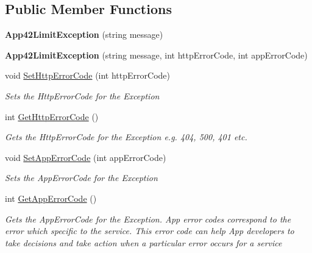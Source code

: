 \subsection*{Public Member Functions}
\begin{DoxyCompactItemize}
\item 
\hypertarget{classcom_1_1shephertz_1_1app42_1_1paas_1_1sdk_1_1csharp_1_1_app42_limit_exception_ac98c7c58d010aa0bf91cc23e1a3260be}{{\bfseries App42\+Limit\+Exception} (string message)}\label{classcom_1_1shephertz_1_1app42_1_1paas_1_1sdk_1_1csharp_1_1_app42_limit_exception_ac98c7c58d010aa0bf91cc23e1a3260be}

\item 
\hypertarget{classcom_1_1shephertz_1_1app42_1_1paas_1_1sdk_1_1csharp_1_1_app42_limit_exception_ab17a56216361854b0c3a8045c3a26895}{{\bfseries App42\+Limit\+Exception} (string message, int http\+Error\+Code, int app\+Error\+Code)}\label{classcom_1_1shephertz_1_1app42_1_1paas_1_1sdk_1_1csharp_1_1_app42_limit_exception_ab17a56216361854b0c3a8045c3a26895}

\item 
void \hyperlink{classcom_1_1shephertz_1_1app42_1_1paas_1_1sdk_1_1csharp_1_1_app42_limit_exception_a641656b981cee64d150760ec808f8dad}{Set\+Http\+Error\+Code} (int http\+Error\+Code)
\begin{DoxyCompactList}\small\item\em Sets the Http\+Error\+Code for the Exception \end{DoxyCompactList}\item 
int \hyperlink{classcom_1_1shephertz_1_1app42_1_1paas_1_1sdk_1_1csharp_1_1_app42_limit_exception_ac9874603444cfabfb26f8e3433bbcd5a}{Get\+Http\+Error\+Code} ()
\begin{DoxyCompactList}\small\item\em Gets the Http\+Error\+Code for the Exception e.\+g. 404, 500, 401 etc. \end{DoxyCompactList}\item 
void \hyperlink{classcom_1_1shephertz_1_1app42_1_1paas_1_1sdk_1_1csharp_1_1_app42_limit_exception_a491b67c10b00bf5ce0a3309e475fc93c}{Set\+App\+Error\+Code} (int app\+Error\+Code)
\begin{DoxyCompactList}\small\item\em Sets the App\+Error\+Code for the Exception \end{DoxyCompactList}\item 
int \hyperlink{classcom_1_1shephertz_1_1app42_1_1paas_1_1sdk_1_1csharp_1_1_app42_limit_exception_ae80380c3789187c87857468bd5483f7f}{Get\+App\+Error\+Code} ()
\begin{DoxyCompactList}\small\item\em Gets the App\+Error\+Code for the Exception. App error codes correspond to the error which specific to the service. This error code can help App developers to take decisions and take action when a particular error occurs for a service \end{DoxyCompactList}\end{DoxyCompactItemize}


